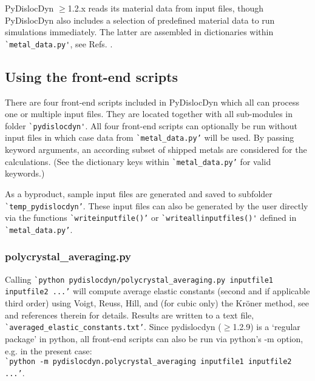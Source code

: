\documentclass[11pt,letterpaper,oneside,pdftex]{article}
\begin{document}
PyDislocDyn $\ge$1.2.x reads its material data from input files, though PyDislocDyn also includes a selection of predefined material data to run simulations immediately.
The latter are assembled in dictionaries within \verb|`metal_data.py'|, see Refs. \cite{Hertzberg:2012,Kaye:2004,CRCHandbook,Wasserbaech:1990,Seeger:1960,Graham:1968,Smith:1966,Kiewel:1996,Samsonov:1968,Epstein:1965,Lowrie:1967,Thomas:1968,Hiki:1966,Leese:1968,Voronov:1978,Alers:1960,Saunders:1986,Powell:1984,Naimon:1971,Riley:1973,Swartz:1972,Rao:1973,Swartz:1970,Singh:1992,Barrera:1993,Jiles:1981,Yogurtcu:1985,Srinivasan:1973a,Rao:1980,Vekilov:2016,Suzuki:1971}.

\subsection{Using the front-end scripts}
\label{sec:frontends}

There are four front-end scripts included in PyDislocDyn which all can process one or multiple input files.
They are located together with all sub-modules in folder \verb|`pydislocdyn'|.
All four front-end scripts can optionally be run without input files in which case data from \verb|`metal_data.py’| will be used.
By passing keyword arguments, an according subset of shipped metals are considered for the calculations.
(See the dictionary keys within \verb|`metal_data.py’| for valid keywords.)

As a byproduct, sample input files are generated and saved to subfolder \verb|`temp_pydislocdyn’|.
These input files can also be generated by the user directly via the functions \verb|`writeinputfile()’| or \verb|`writeallinputfiles()'| defined in \verb|`metal_data.py’|.


\subsubsection{polycrystal\_averaging.py}

Calling \verb|`python pydislocdyn/polycrystal_averaging.py inputfile1 inputfile2 ...’| will compute average elastic constants (second and if applicable third order) using Voigt, Reuss, Hill, and (for cubic only) the Kr{\"o}ner method, see \cite{Blaschke:2017Poly} and references therein for details.
Results are written to a text file,
\verb|`averaged_elastic_constants.txt’|.
Since pydislocdyn ($\ge$1.2.9) is a `regular package' in python, all front-end scripts can also be run via python's -m option, e.g. in the present case:\\
\verb|`python -m pydislocdyn.polycrystal_averaging inputfile1 inputfile2 ...’|.
\end{document}
